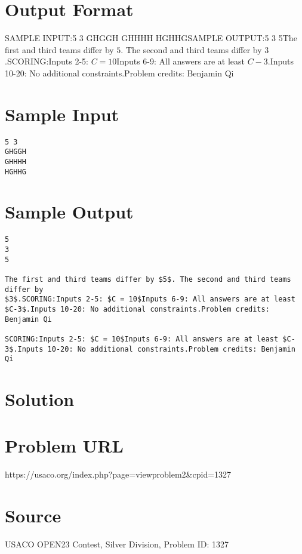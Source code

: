 \documentclass[12pt]{article}
\begin{document}
\section*{Output Format}
SAMPLE INPUT:5 3
GHGGH
GHHHH
HGHHGSAMPLE OUTPUT:5
3
5The first and third teams differ by $5$. The second and third teams differ by
$3$.SCORING:Inputs 2-5: $C = 10$Inputs 6-9: All answers are at least $C-3$.Inputs 10-20: No additional constraints.Problem credits: Benjamin Qi

\section*{Sample Input}
\begin{verbatim}
5 3
GHGGH
GHHHH
HGHHG
\end{verbatim}

\section*{Sample Output}
\begin{verbatim}
5
3
5

The first and third teams differ by $5$. The second and third teams differ by
$3$.SCORING:Inputs 2-5: $C = 10$Inputs 6-9: All answers are at least $C-3$.Inputs 10-20: No additional constraints.Problem credits: Benjamin Qi

SCORING:Inputs 2-5: $C = 10$Inputs 6-9: All answers are at least $C-3$.Inputs 10-20: No additional constraints.Problem credits: Benjamin Qi
\end{verbatim}

\section*{Solution}


\section*{Problem URL}
https://usaco.org/index.php?page=viewproblem2&cpid=1327

\section*{Source}
USACO OPEN23 Contest, Silver Division, Problem ID: 1327
\end{document}
